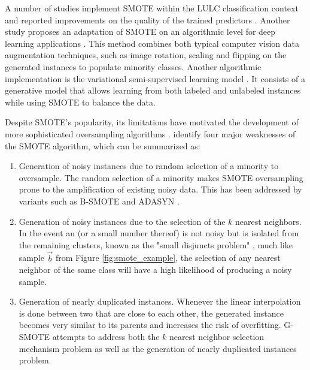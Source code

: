 \documentclass[remotesensing,article,submit,moreauthors,pdftex]{Definitions/mdpi}
\begin{document}
\begin{paracol}{2}
\linenumbers
\switchcolumn

A number of studies implement SMOTE within the LULC classification context and
reported improvements on the quality of the trained predictors
\cite{Jozdani2019, Bogner2018}. Another study proposes an adaptation of SMOTE on
an algorithmic level for deep learning applications \cite{Zhu2020}. This method
combines both typical computer vision data augmentation techniques, such as
image rotation, scaling and flipping on the generated instances to populate
minority classes. Another algorithmic implementation is the variational
semi-supervised learning model \cite{Cenggoro2018}. It consists of a generative
model that allows learning from both labeled and unlabeled instances while
using SMOTE to balance the data.

Despite SMOTE's popularity, its limitations have motivated the development of
more sophisticated oversampling algorithms \cite{Douzas2019, Han2005, Ma2017,
Douzas2017, Douzas2018, HaiboHe2008}. \cite{Douzas2019} identify four major
weaknesses of the SMOTE algorithm, which can be summarized as:

\begin{enumerate}
    \item Generation of noisy instances due to random selection of a
        minority to oversample. The random
        selection of a minority makes SMOTE
        oversampling prone to the amplification of existing noisy data. This
        has been addressed by variants such as B-SMOTE \cite{Han2005} and
        ADASYN \cite{HaiboHe2008}. 

    \item Generation of noisy instances due to the selection of the $k$
        nearest neighbors. In the event an
        (or a small number thereof) is not noisy but is isolated from the
        remaining clusters, known as the "small disjuncts problem"
        \cite{holte1989}, much like sample $\overrightarrow{b}$ from Figure
        \ref{fig:smote_example}, the selection of any nearest neighbor of the
        same class will have a high likelihood of producing a noisy sample.

    \item Generation of nearly duplicated instances. Whenever the linear
        interpolation is done between two
        that are close to each other, the generated instance becomes very
        similar to its parents and increases the risk of overfitting. G-SMOTE
        \cite{Douzas2019} attempts to address both the $k$ nearest neighbor
        selection mechanism problem as well as the generation of nearly
        duplicated instances problem. 


\end{enumerate}
\end{paracol}
\end{document}
